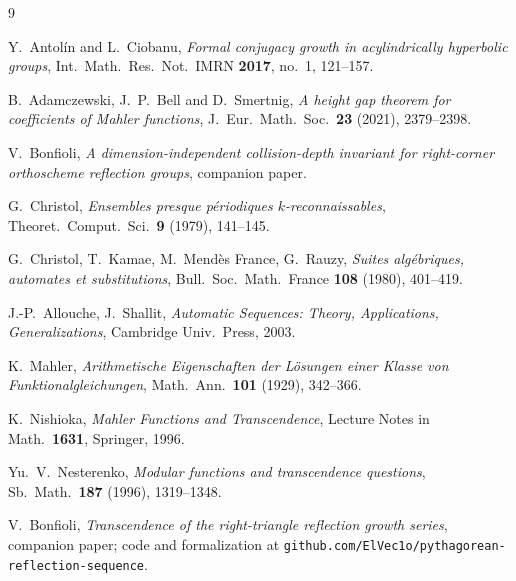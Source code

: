 \documentclass[11pt,a4paper]{article}
\theoremstyle{remark}
\theoremstyle{plain}
\begin{document}
\begin{thebibliography}{9}

 Y.~Antol\'in and L.~Ciobanu, \emph{Formal conjugacy growth in
acylindrically hyperbolic groups}, Int.\ Math.\ Res.\ Not.\ IMRN \textbf{2017}, no.~1,
121--157.

 B.~Adamczewski, J.~P.~Bell and D.~Smertnig, \emph{A height gap theorem for
coefficients of Mahler functions}, J.\ Eur.\ Math.\ Soc.\ \textbf{23} (2021), 2379--2398.

 V.~Bonfioli, \emph{A dimension-independent collision-depth invariant for
right-corner orthoscheme reflection groups}, companion paper.

 G.~Christol, \emph{Ensembles presque p\'eriodiques $k$-reconnaissables},
Theoret.\ Comput.\ Sci.\ \textbf{9} (1979), 141--145.

 G.~Christol, T.~Kamae, M.~Mend\`es France, G.~Rauzy,
\emph{Suites alg\'ebriques, automates et substitutions},
Bull.\ Soc.\ Math.\ France \textbf{108} (1980), 401--419.

 J.-P.~Allouche, J.~Shallit, \emph{Automatic Sequences: Theory,
Applications, Generalizations}, Cambridge Univ.\ Press, 2003.

 K.~Mahler, \emph{Arithmetische Eigenschaften der L\"osungen einer Klasse
von Funktionalgleichungen}, Math.\ Ann.\ \textbf{101} (1929), 342--366.

 K.~Nishioka, \emph{Mahler Functions and Transcendence},
Lecture Notes in Math.\ \textbf{1631}, Springer, 1996.

 Yu.~V.~Nesterenko, \emph{Modular functions and transcendence
questions}, Sb.\ Math.\ \textbf{187} (1996), 1319--1348.

 V.~Bonfioli, \emph{Transcendence of the right-triangle reflection growth
series}, companion paper; code and formalization at
\texttt{github.com/ElVec1o/pythagorean-reflection-sequence}.

\end{thebibliography}
\end{document}
